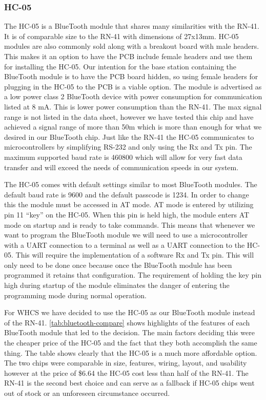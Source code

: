 \subsubsection{HC-05}
The HC{}-05 is a BlueTooth module that shares many similarities with the
RN{}-41. It is of comparable size to the RN{}-41 with dimensions of 27x13mm.
HC{}-05 modules are also commonly sold along with a breakout board with male
headers. This makes it an option to have the PCB include female headers and use
them for installing the HC{}-05. Our intention for the base station containing
the BlueTooth module is to have the PCB board hidden, so using female headers
for plugging in the HC{}-05 to the PCB is a viable option. The module is
advertised as a low power class 2 BlueTooth device with power consumption for
communication listed at 8 mA. This is lower power consumption than the RN{}-41.
The max signal range is not listed in the data sheet, however we have tested
this chip and have achieved a signal range of more than 50m which is more than
enough for what we desired in our BlueTooth chip. Just like the RN{}-41 the
HC{}-05 communicates to microcontrollers by simplifying RS{}-232 and only using
the Rx and Tx pin. The maximum supported baud rate is 460800 which will allow
for very fast data transfer and will exceed the needs of communication speeds
in our system.

The HC{}-05 comes with default settings similar to most BlueTooth modules. The
default baud rate is 9600 and the default passcode is 1234. In order to change
this the module must be accessed in AT mode. AT mode is entered by utilizing
pin 11 {}``key{}'' on the HC{}-05. When this pin is held high, the module
enters AT mode on startup and is ready to take commands. This means that
whenever we want to program the BlueTooth module we will need to use a
microcontroller with a UART connection to a terminal as well as a UART
connection to the HC{}-05. This will require the implementation of a software
Rx and Tx pin. This will only need to be done once because once the BlueTooth
module has been programmed it retains that configuration. The requirement of
holding the key pin high during startup of the module eliminates the danger of
entering the programming mode during normal operation.

For WHCS we have decided to use the HC{}-05 as our BlueTooth module instead of
the RN{}-41. \autoref{tab:bluetooth-compare} shows highlights of the features of each
BlueTooth module that led to the decision. The main factors deciding this were
the cheaper price of the HC{}-05 and the fact that they both accomplish the
same thing. The table shows clearly that the HC{}-05 is a much more affordable
option. The two chips were comparable in size, features, wiring, layout, and
usability however at the price of \$6.64 the HC{}-05 cost less than half of the
RN{}-41. The RN{}-41 is the second best choice and can serve as a fallback if
HC{}-05 chips went out of stock or an unforeseen circumstance occurred.

